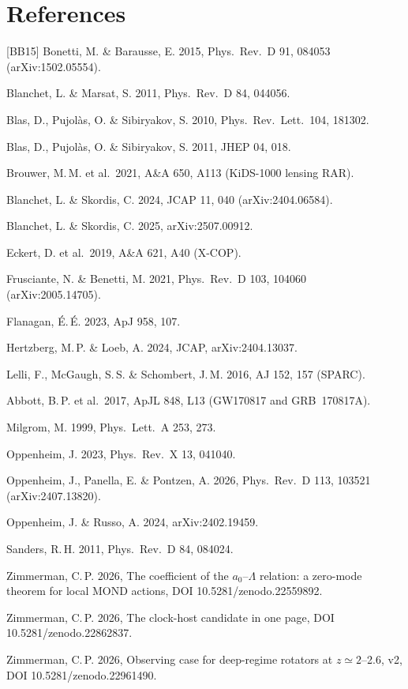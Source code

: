 \documentclass[10pt]{article}
\begin{document}
\section*{References}
{\small
[BB15] Bonetti, M. \& Barausse, E. 2015, Phys.\ Rev.\ D 91, 084053 (arXiv:1502.05554).\par
[BM11] Blanchet, L. \& Marsat, S. 2011, Phys.\ Rev.\ D 84, 044056.\par
[BPS10] Blas, D., Pujol\`as, O. \& Sibiryakov, S. 2010, Phys.\ Rev.\ Lett.\ 104, 181302.\par
[BPS11] Blas, D., Pujol\`as, O. \& Sibiryakov, S. 2011, JHEP 04, 018.\par
[Bro21] Brouwer, M.\,M. et al.\ 2021, A\&A 650, A113 (KiDS-1000 lensing RAR).\par
[BS24] Blanchet, L. \& Skordis, C. 2024, JCAP 11, 040 (arXiv:2404.06584).\par
[BS25] Blanchet, L. \& Skordis, C. 2025, arXiv:2507.00912.\par
[Eck19] Eckert, D. et al.\ 2019, A\&A 621, A40 (X-COP).\par
[FB21] Frusciante, N. \& Benetti, M. 2021, Phys.\ Rev.\ D 103, 104060 (arXiv:2005.14705).\par
[Fla23] Flanagan, \'E.\,\'E. 2023, ApJ 958, 107.\par
[HL24] Hertzberg, M.\,P. \& Loeb, A. 2024, JCAP, arXiv:2404.13037.\par
[LMS16] Lelli, F., McGaugh, S.\,S. \& Schombert, J.\,M. 2016, AJ 152, 157 (SPARC).\par
[LVC17] Abbott, B.\,P. et al.\ 2017, ApJL 848, L13 (GW170817 and GRB~170817A).\par
[Mil99] Milgrom, M. 1999, Phys.\ Lett.\ A 253, 273.\par
[Opp23] Oppenheim, J. 2023, Phys.\ Rev.\ X 13, 041040.\par
[OPP26] Oppenheim, J., Panella, E. \& Pontzen, A. 2026, Phys.\ Rev.\ D 113, 103521 (arXiv:2407.13820).\par
[OR24] Oppenheim, J. \& Russo, A. 2024, arXiv:2402.19459.\par
[San11] Sanders, R.\,H. 2011, Phys.\ Rev.\ D 84, 084024.\par
[Z26a] Zimmerman, C.\,P. 2026, The coefficient of the $a_0$--$\Lambda$ relation: a zero-mode theorem for local MOND actions, DOI 10.5281/zenodo.22559892.\par
[Z26b] Zimmerman, C.\,P. 2026, The clock-host candidate in one page, DOI 10.5281/zenodo.22862837.\par
[Z26c] Zimmerman, C.\,P. 2026, Observing case for deep-regime rotators at $z\simeq2$--2.6, v2, DOI 10.5281/zenodo.22961490.\par
}
\end{document}
